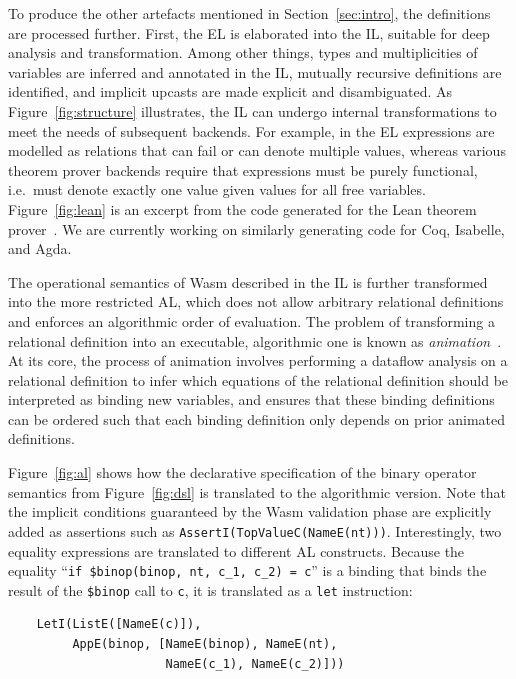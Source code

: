 To produce the other artefacts mentioned in Section~\ref{sec:intro},
the \dslname definitions are processed further.
First, the EL is elaborated into the IL, suitable for deep analysis and transformation.
Among other things, types and multiplicities of variables are inferred and annotated in the IL, mutually recursive definitions are identified, and implicit upcasts are made explicit and disambiguated.
%
As Figure~\ref{fig:structure} illustrates, the IL can undergo internal transformations to meet the needs of subsequent backends.
%
For example, in the EL expressions are modelled as
relations that can fail or can denote multiple values,  whereas various theorem prover
backends require that expressions must be purely functional, i.e.\ must denote exactly
one value given values for all free variables.
Figure~\ref{fig:lean} is an excerpt from the code generated for the Lean theorem prover~\cite{Moura2015TheLT}.
We are currently working on similarly generating code for Coq, Isabelle, and Agda.

The operational semantics of Wasm described in the IL is further transformed into the more restricted AL,
which does not allow arbitrary relational definitions and
enforces an algorithmic order of evaluation.
The problem of transforming a relational definition into an
executable, algorithmic one is known as \textit{animation}~\cite{animate}.
At its core, the process of animation involves performing a dataflow analysis on a relational definition to infer which equations of the relational definition should be interpreted as binding new variables, and ensures that these binding definitions can be ordered such that each binding definition only depends on prior animated definitions.



{\sloppypar
Figure~\ref{fig:al} shows how the declarative specification of the
binary operator semantics from Figure~\ref{fig:dsl} is translated to the algorithmic version.
Note that the implicit conditions guaranteed by the Wasm validation phase
are explicitly added as assertions such as
{\small\verb!AssertI(TopValueC(NameE(nt)))!}.
Interestingly, two equality expressions are translated to different AL constructs.
Because the equality ``{\small\verb!if $binop(binop, nt, c_1, c_2) = c!}'' is a binding
that binds the result of the {\small\verb!$binop!} call to {\small\verb!c!}, it is translated as
a {\small\verb!let!} instruction:
}

\smallskip
{\small
\begin{verbatim}
    LetI(ListE([NameE(c)]),
         AppE(binop, [NameE(binop), NameE(nt),
                      NameE(c_1), NameE(c_2)]))
\end{verbatim}
}
\smallskip

